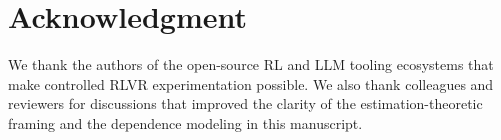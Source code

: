 \section{Acknowledgment}

We thank the authors of the open-source RL and LLM tooling ecosystems that make controlled RLVR experimentation possible.
We also thank colleagues and reviewers for discussions that improved the clarity of the estimation-theoretic framing and the dependence modeling in this manuscript.

